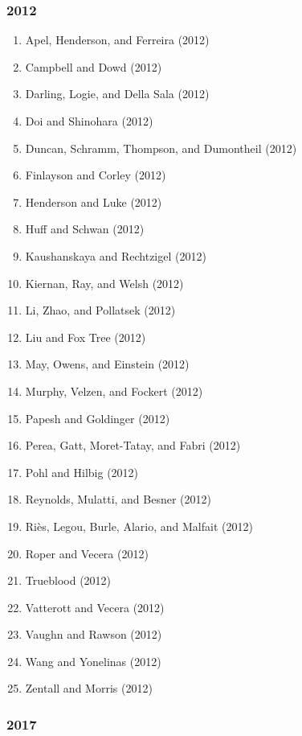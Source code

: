 \documentclass[english,man]{apa6}
\providecommand{\tightlist}{%
  \setlength{\itemsep}{0pt}\setlength{\parskip}{0pt}}
\theoremstyle{definition}
\theoremstyle{definition}
\theoremstyle{definition}
\theoremstyle{remark}
\begin{document}
\subsubsection{2012}\label{section-44}

\begin{enumerate}
\def\labelenumi{\arabic{enumi})}
\tightlist
\item
  Apel, Henderson, and Ferreira (2012)
\item
  Campbell and Dowd (2012)
\item
  Darling, Logie, and Della Sala (2012)
\item
  Doi and Shinohara (2012)
\item
  Duncan, Schramm, Thompson, and Dumontheil (2012)
\item
  Finlayson and Corley (2012)
\item
  Henderson and Luke (2012)
\item
  Huff and Schwan (2012)
\item
  Kaushanskaya and Rechtzigel (2012)
\item
  Kiernan, Ray, and Welsh (2012)
\item
  Li, Zhao, and Pollatsek (2012)
\item
  Liu and Fox Tree (2012)
\item
  May, Owens, and Einstein (2012)
\item
  Murphy, Velzen, and Fockert (2012)
\item
  Papesh and Goldinger (2012)
\item
  Perea, Gatt, Moret-Tatay, and Fabri (2012)
\item
  Pohl and Hilbig (2012)
\item
  Reynolds, Mulatti, and Besner (2012)
\item
  Riès, Legou, Burle, Alario, and Malfait (2012)
\item
  Roper and Vecera (2012)
\item
  Trueblood (2012)
\item
  Vatterott and Vecera (2012)
\item
  Vaughn and Rawson (2012)
\item
  Wang and Yonelinas (2012)
\item
  Zentall and Morris (2012)
\end{enumerate}

\subsubsection{2017}\label{section-45}
\end{document}
